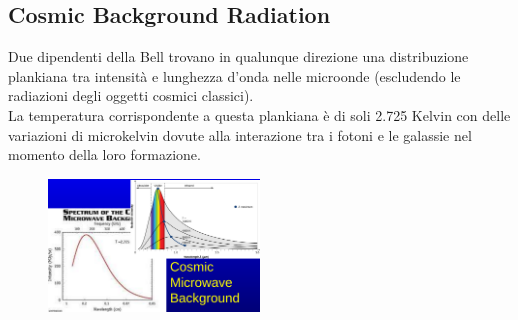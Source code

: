 \documentclass[a4paper,11pt]{article}
\begin{document}
\subsection{Cosmic Background Radiation}
Due dipendenti della Bell trovano in qualunque direzione una distribuzione plankiana tra intensità e lunghezza d'onda nelle microonde (escludendo le radiazioni degli oggetti cosmici classici). \\
La temperatura corrispondente a questa plankiana è di soli 2.725 Kelvin con delle variazioni di microkelvin dovute alla interazione tra i fotoni e le galassie nel momento della loro formazione. \\
\begin{figure}[h!!]
        \centering
        \includegraphics[width=0.5\textwidth]{immagini16dic/cmbplank.png}
        \label{}
    \end{figure}
 \newpage
\end{document}
